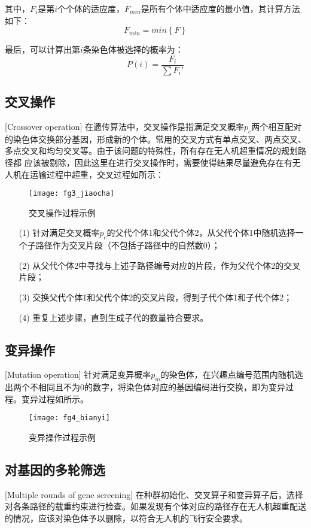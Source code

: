 其中，$F_i$是第$i$个个体的适应度，$F_{min}$是所有个体中适应度的最小值，其计算方法如下：
$$ F_{min} = min\left\{F\right\} $$


最后，可以计算出第$i$条染色体被选择的概率为：
$$ P(i) = \frac{F_i}{\sum F_i'} $$

\subsection{交叉操作}[Crossover operation]
在遗传算法中，交叉操作是指满足交叉概率$p_c$两个相互配对的染色体交换部分基因，形成新的个体。常用的交叉方式有单点交叉、两点交叉、多点交叉和均匀交叉等。由于该问题的特殊性，所有存在无人机超重情况的规划路径都
应该被剔除，因此这里在进行交叉操作时，需要使得结果尽量避免存在有无人机在运输过程中超重，交叉过程如所示：
\begin{figure}[ht]
	\centering
	\texttt{[image: fg3\_jiaocha]}
	\caption{交叉操作过程示例}
	\label{fg401}
\end{figure}


\begin{itemize}
	\item [(1)] 针对满足交叉概率$p_c$的父代个体1和父代个体2，从父代个体1中随机选择一个子路径作为交叉片段（不包括子路径中的自然数0）；
	\item [(2)] 从父代个体2中寻找与上述子路径编号对应的片段，作为父代个体2的交叉片段；
	\item [(3)] 交换父代个体1和父代个体2的交叉片段，得到子代个体1和子代个体2；
 	\item [(4)] 重复上述步骤，直到生成子代的数量符合要求。
\end{itemize}

\subsection{变异操作}[Mutation operation]
针对满足变异概率$p_m$的染色体，在兴趣点编号范围内随机选出两个不相同且不为0的数字，将染色体对应的基因编码进行交换，即为变异过程。变异过程如所示。
\begin{figure}[ht]
	\centering
	\texttt{[image: fg4\_bianyi]}
	\caption{变异操作过程示例}
	\label{fg402}
\end{figure}
\subsection{对基因的多轮筛选}[Multiple rounds of gene screening]
在种群初始化、交叉算子和变异算子后，选择对各条路径的载重约束进行检查。如果发现有个体对应的路径存在无人机超重配送的情况，应该对染色体予以删除，以符合无人机的飞行安全要求。

